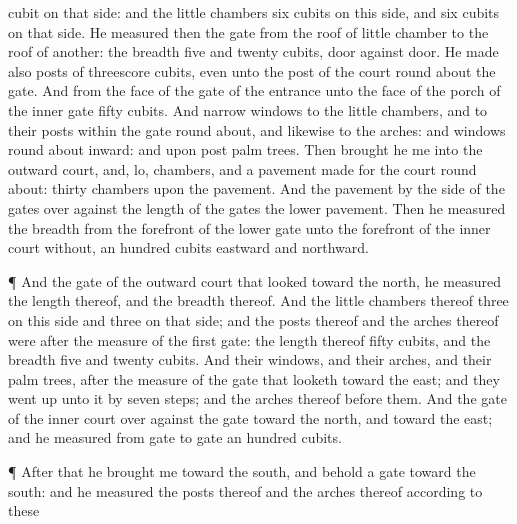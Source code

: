{cubit on that side: and the little
chambers
{}
six
cubits on this side, and
six
cubits on that side.
He
measured then the
gate from the
roof of
{} little
chamber to the
roof of another: the
breadth
{}
five and
twenty
cubits,
door against
door.
He
made also
posts of
threescore
cubits, even unto the
post of the
court round
about the
gate.
And from the
face of the
gate of the
entrance unto the
face of the
porch of the
inner
gate
{}
fifty
cubits.
And
{}
narrow
windows to the little
chambers, and to their
posts
within the
gate round
about, and likewise to the
arches: and
windows
{} round
about
inward: and upon
{}
post
{} palm
trees.
Then
brought he me into the
outward
court, and, lo,
{}
chambers, and a
pavement
made for the
court round
about:
thirty
chambers
{} upon the
pavement.
And the
pavement by the
side of the
gates over
against the
length of the
gates
{} the
lower
pavement.
Then he
measured the
breadth from the
forefront of the
lower
gate unto the
forefront of the
inner
court
without, an
hundred
cubits
eastward and
northward.
\par }{\PP {}¶ And the
gate of the
outward
court that
looked
toward the
north, he
measured the
length thereof, and the
breadth thereof.
And the little
chambers thereof
{}
three on this side and
three on that side; and the
posts thereof and the
arches thereof were after the
measure of the
first
gate: the
length thereof
{}
fifty
cubits, and the
breadth
five and
twenty
cubits.
And their
windows, and their
arches, and their palm
trees,
{} after the
measure of the
gate that
looketh
toward the
east; and they went
up unto it by
seven
steps; and the
arches thereof
{}
before them.
And the
gate of the
inner
court
{} over against the
gate toward the
north, and toward the
east; and he
measured from
gate to
gate an
hundred
cubits.
\par }{\PP {}¶ After that he
brought me
toward the
south, and behold a
gate
toward the
south: and he
measured the
posts thereof and the
arches thereof according to these
}
